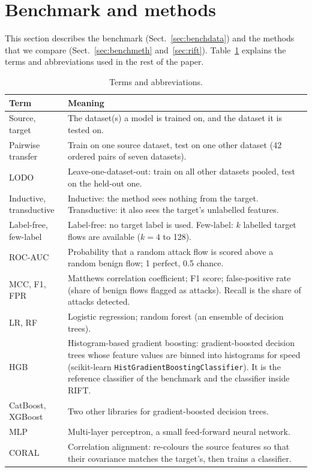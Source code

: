 \documentclass[11pt]{article}
\begin{document}
\section{Benchmark and methods}\label{sec:bench}
This section describes the benchmark (Sect.~\ref{sec:benchdata}) and the methods that we compare (Sect.~\ref{sec:benchmeth} and~\ref{sec:rift}).
Table~\ref{tab:terms} explains the terms and abbreviations used in the rest of the paper.

\begin{table}[t]
\centering\small
\caption{Terms and abbreviations.}\label{tab:terms}
\begin{tabular}{p{}p{}}
\toprule
Term & Meaning \\
\midrule
Source, target & The dataset(s) a model is trained on, and the dataset it is tested on. \\
Pairwise transfer & Train on one source dataset, test on one other dataset (42 ordered pairs of seven datasets). \\
LODO & Leave-one-dataset-out: train on all other datasets pooled, test on the held-out one. \\
Inductive, transductive & Inductive: the method sees nothing from the target. Transductive: it also sees the target's unlabelled features. \\
Label-free, few-label & Label-free: no target label is used. Few-label: $k$ labelled target flows are available ($k=4$ to 128). \\
ROC-AUC & Probability that a random attack flow is scored above a random benign flow; 1 perfect, 0.5 chance. \\
MCC, F1, FPR & Matthews correlation coefficient; F1 score; false-positive rate (share of benign flows flagged as attacks). Recall is the share of attacks detected. \\
LR, RF & Logistic regression; random forest (an ensemble of decision trees). \\
HGB & Histogram-based gradient boosting: gradient-boosted decision trees whose feature values are binned into histograms for speed (scikit-learn \texttt{HistGradientBoostingClassifier}). It is the reference classifier of the benchmark and the classifier inside RIFT. \\
CatBoost, XGBoost & Two other libraries for gradient-boosted decision trees. \\
MLP & Multi-layer perceptron, a small feed-forward neural network. \\
CORAL & Correlation alignment: re-colours the source features so that their covariance matches the target's, then trains a classifier. \\

\end{tabular}
\end{table}
\end{document}
